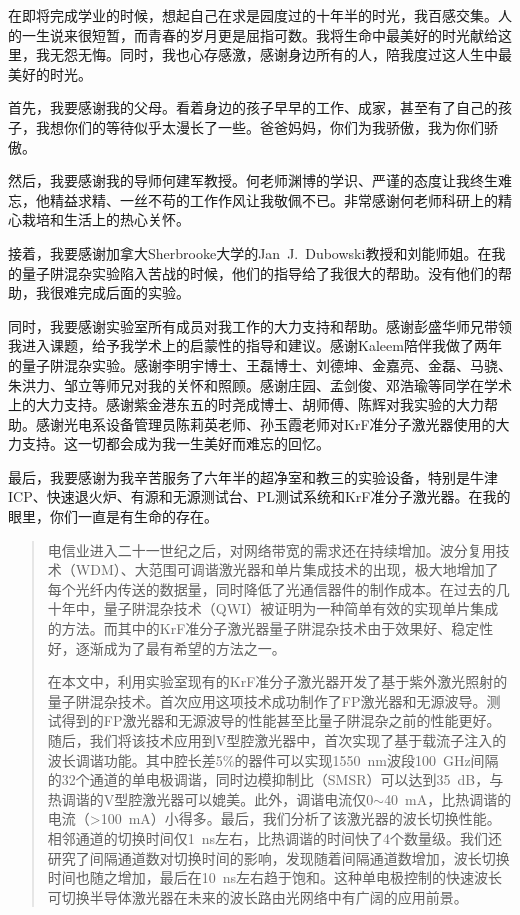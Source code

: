 \documentclass{ZJUthesis}
\begin{document}
\begin{thanks}

在即将完成学业的时候，想起自己在求是园度过的十年半的时光，我百感交集。人的一生说来很短暂，而青春的岁月更是屈指可数。我将生命中最美好的时光献给这里，我无怨无悔。同时，我也心存感激，感谢身边所有的人，陪我度过这人生中最美好的时光。

首先，我要感谢我的父母。看着身边的孩子早早的工作、成家，甚至有了自己的孩子，我想你们的等待似乎太漫长了一些。爸爸妈妈，你们为我骄傲，我为你们骄傲。

然后，我要感谢我的导师何建军教授。何老师渊博的学识、严谨的态度让我终生难忘，他精益求精、一丝不苟的工作作风让我敬佩不已。非常感谢何老师科研上的精心栽培和生活上的热心关怀。

接着，我要感谢加拿大Sherbrooke大学的Jan~J.~Dubowski教授和刘能师姐。在我的量子阱混杂实验陷入苦战的时候，他们的指导给了我很大的帮助。没有他们的帮助，我很难完成后面的实验。

同时，我要感谢实验室所有成员对我工作的大力支持和帮助。感谢彭盛华师兄带领我进入课题，给予我学术上的启蒙性的指导和建议。感谢Kaleem陪伴我做了两年的量子阱混杂实验。感谢李明宇博士、王磊博士、刘德坤、金嘉亮、金磊、马骁、朱洪力、邹立等师兄对我的关怀和照顾。感谢庄园、孟剑俊、邓浩瑜等同学在学术上的大力支持。感谢紫金港东五的时尧成博士、胡师傅、陈辉对我实验的大力帮助。感谢光电系设备管理员陈莉英老师、孙玉霞老师对KrF准分子激光器使用的大力支持。这一切都会成为我一生美好而难忘的回忆。

最后，我要感谢为我辛苦服务了六年半的超净室和教三的实验设备，特别是牛津ICP、快速退火炉、有源和无源测试台、PL测试系统和KrF准分子激光器。在我的眼里，你们一直是有生命的存在。

\end{thanks}
\begin{abstract}

电信业进入二十一世纪之后，对网络带宽的需求还在持续增加。波分复用技术（WDM）、大范围可调谐激光器和单片集成技术的出现，极大地增加了每个光纤内传送的数据量，同时降低了光通信器件的制作成本。在过去的几十年中，量子阱混杂技术（QWI）被证明为一种简单有效的实现单片集成的方法。而其中的KrF准分子激光器量子阱混杂技术由于效果好、稳定性好，逐渐成为了最有希望的方法之一。

在本文中，利用实验室现有的KrF准分子激光器开发了基于紫外激光照射的量子阱混杂技术。首次应用这项技术成功制作了FP激光器和无源波导。测试得到的FP激光器和无源波导的性能甚至比量子阱混杂之前的性能更好。随后，我们将该技术应用到V型腔激光器中，首次实现了基于载流子注入的波长调谐功能。其中腔长差5\%的器件可以实现1550~nm波段100~GHz间隔的32个通道的单电极调谐，同时边模抑制比（SMSR）可以达到35~dB，与热调谐的V型腔激光器可以媲美。此外，调谐电流仅0$\sim$40~mA，比热调谐的电流（>100~mA）小得多。最后，我们分析了该激光器的波长切换性能。相邻通道的切换时间仅1~ns左右，比热调谐的时间快了4个数量级。我们还研究了间隔通道数对切换时间的影响，发现随着间隔通道数增加，波长切换时间也随之增加，最后在10~ns左右趋于饱和。这种单电极控制的快速波长可切换半导体激光器在未来的波长路由光网络中有广阔的应用前景。

\end{abstract}
\end{document}

